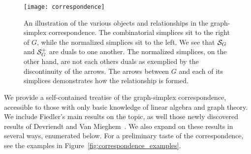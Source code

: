 \begin{figure}
	\centering 
	\texttt{[image: correspondence]}
	\caption{An illustration of the various objects and relationships in the graph-simplex correspondence. The combinatorial simplices sit to the right of $G$, while the normalized simplices sit to the left. We see that  $\mathcal{S}_G$ and $\mathcal{S}_G^+$ are duals to one another. The normalized simplices,  on the other hand, are not each others duals as exemplied by the discontinuity of the arrows. The arrows between $G$ and each of its simplices demonstrates how the relationship is formed.  }
	\label{fig:correspondence}
\end{figure}

We provide a self-contained treatise of the graph-simplex correspondence, accessible  to those with only  basic knowledge of linear algebra and  graph theory. We include Fiedler's main results  on the topic, as well those newly discovered results of Devriendt and Van Mieghem~\cite{devriendt2018simplex}. We also expand on these results in several ways,  enumerated  below. For a preliminary taste of the correspondence, see the examples  in Figure~\ref{fig:correspondence_examples}. 




